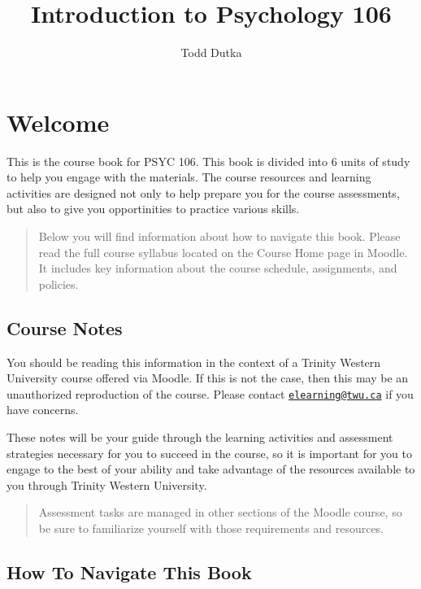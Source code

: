 \documentclass[
]{book}
\title{Introduction to Psychology 106}
\author{Todd Dutka}
\date{}
\begin{document}
\maketitle

{
\setcounter{tocdepth}{1}
\tableofcontents
}
\hypertarget{welcome}{%
\chapter*{Welcome}\label{welcome}}

This is the course book for PSYC 106. This book is divided into 6 units of study to help you engage with the materials. The course resources and learning activities are designed not only to help prepare you for the course assessments, but also to give you opportinities to practice various skills.

\begin{quote}
Below you will find information about how to navigate this book. Please read the full course syllabus located on the Course Home page in Moodle. It includes key information about the course schedule, assignments, and policies.
\end{quote}

\hypertarget{course-notes}{%
\section*{Course Notes}\label{course-notes}}

You should be reading this information in the context of a Trinity Western University course offered via Moodle. If this is not the case, then this may be an unauthorized reproduction of the course. Please contact \href{mailto:elearning@twu.ca}{\nolinkurl{elearning@twu.ca}} if you have concerns.

These notes will be your guide through the learning activities and assessment strategies necessary for you to succeed in the course, so it is important for you to engage to the best of your ability and take advantage of the resources available to you through Trinity Western University.

\begin{quote}
Assessment tasks are managed in other sections of the Moodle course, so be sure to familiarize yourself with those requirements and resources.
\end{quote}

\hypertarget{how-to-navigate-this-book}{%
\section*{How To Navigate This Book}\label{how-to-navigate-this-book}}
\end{document}
